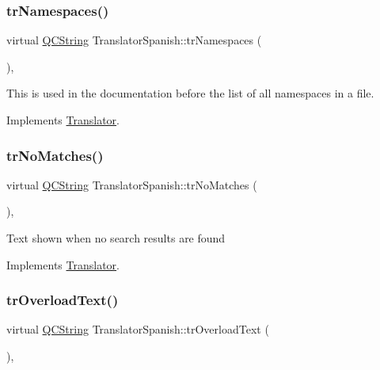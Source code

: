 \subsubsection{\texorpdfstring{trNamespaces()}{trNamespaces()}}
{\footnotesize\ttfamily virtual \mbox{\hyperlink{class_q_c_string}{Q\+C\+String}} Translator\+Spanish\+::tr\+Namespaces (\begin{DoxyParamCaption}{ }\end{DoxyParamCaption})\hspace{0.3cm}{\ttfamily [inline]}, {\ttfamily [virtual]}}

This is used in the documentation before the list of all namespaces in a file. 

Implements \mbox{\hyperlink{class_translator}{Translator}}.

\mbox{\label{class_translator_spanish_a3ea3f2d567bfc17748bb236a64825909}} 
\subsubsection{\texorpdfstring{trNoMatches()}{trNoMatches()}}
{\footnotesize\ttfamily virtual \mbox{\hyperlink{class_q_c_string}{Q\+C\+String}} Translator\+Spanish\+::tr\+No\+Matches (\begin{DoxyParamCaption}{ }\end{DoxyParamCaption})\hspace{0.3cm}{\ttfamily [inline]}, {\ttfamily [virtual]}}

Text shown when no search results are found 

Implements \mbox{\hyperlink{class_translator}{Translator}}.

\mbox{\label{class_translator_spanish_a043d7af1d58133c58a01547bb0696be6}} 
\subsubsection{\texorpdfstring{trOverloadText()}{trOverloadText()}}
{\footnotesize\ttfamily virtual \mbox{\hyperlink{class_q_c_string}{Q\+C\+String}} Translator\+Spanish\+::tr\+Overload\+Text (\begin{DoxyParamCaption}{ }\end{DoxyParamCaption})\hspace{0.3cm}{\ttfamily [inline]}, {\ttfamily [virtual]}}

